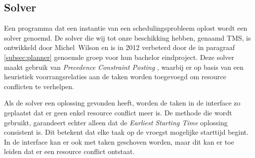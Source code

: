 \subsection{Solver}
\label{subsec:solver}

Een programma dat een instantie van een schedulingsprobleem oplost wordt een solver genoemd. De solver die wij tot onze beschikking hebben, genaamd TMS, is ontwikkeld door \mbox{Michel Wilson} en is in 2012 verbeterd door de in paragraaf \ref{subsec:planner} genoemde groep voor hun bachelor eindproject. Deze solver maakt gebruik van \emph{Precedence Constraint Posting} \cite{seminarium2014}, waarbij er op basis van een heuristiek voorrangsrelaties aan de taken worden toegevoegd om resource conflicten te verhelpen.

Als de solver een oplossing gevonden heeft, worden de taken in de interface zo geplaatst dat er geen enkel resource conflict meer is. De methode die wordt gebruikt, garandeert echter alleen dat de \emph{Earliest Starting Time} oplossing consistent is. Dit betekent dat elke taak op de vroegst mogelijke starttijd begint. In de interface kan er ook met taken geschoven worden, maar dit kan er toe leiden dat er een resource conflict ontstaat. 
